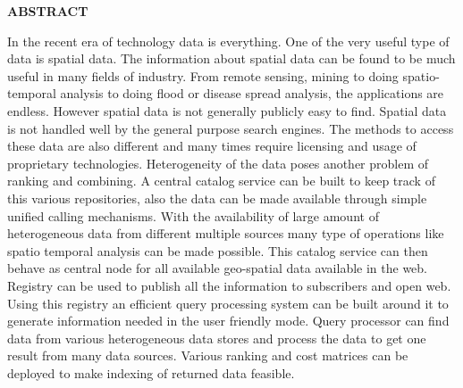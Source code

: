 \centerline {\textbf {\LARGE ABSTRACT}}

\vspace*{1cm}
In the recent era of technology data is everything. One of the very useful type of data is spatial data. The information about spatial data can be found to be much useful in many fields of industry. From remote sensing, mining to doing spatio-temporal analysis to doing flood or disease spread analysis, the applications are endless. However spatial data is not generally publicly easy to find. Spatial data is not handled well by the general purpose search engines. The methods to access these data are also different and many times require licensing and usage of proprietary technologies. Heterogeneity of the data poses another problem of ranking and combining.  A central catalog service can be built to keep track of this various repositories, also the data can be made available through simple unified calling mechanisms. With the availability of large amount of heterogeneous data from different multiple sources many type of operations like spatio temporal analysis can be made possible. This catalog service can then behave as central node for all available geo-spatial data available in the web. Registry can be used to publish all the information to subscribers and open web. Using this registry an efficient query processing system can be built around it to generate information needed in the user friendly mode. Query processor can find data from various heterogeneous data stores and process the data to get one result from many data sources. Various ranking and cost matrices can be deployed to make indexing of returned data feasible.\\

